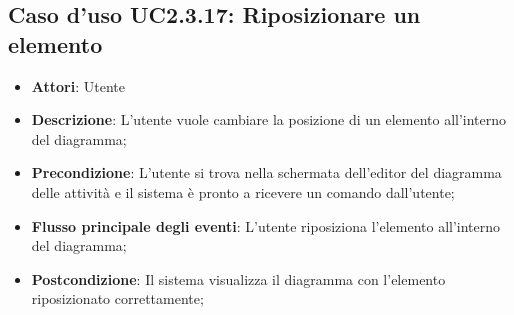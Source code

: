 \documentclass[../AnalisiDeiRequisiti.tex]{subfiles}
\begin{document}
					\subsection{Caso d'uso UC2.3.17: Riposizionare un elemento}
					\begin{itemize}
						\item \textbf{Attori}: Utente
						\item \textbf{Descrizione}: L'utente vuole cambiare la posizione di un elemento all'interno del diagramma;
						\item \textbf{Precondizione}: L'utente si trova nella schermata dell'editor del diagramma delle attività e il sistema è pronto a ricevere un comando dall'utente;
						\item \textbf{Flusso principale degli eventi}: L'utente riposiziona l'elemento all'interno del diagramma;
						\item \textbf{Postcondizione}: Il sistema visualizza il diagramma con l'elemento riposizionato correttamente;
					\end{itemize}
\end{document}

